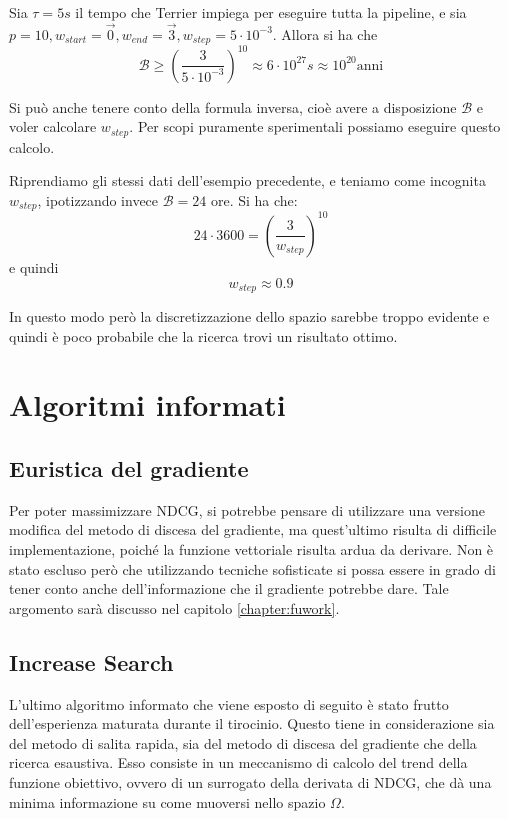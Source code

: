 \begin{esempio}\label{ex:gsspace}
	Sia $\tau = 5s$ il tempo che Terrier impiega per eseguire tutta la pipeline, e sia $p=10, w_{start} = \vec{0}, w_{end} = \vec{3}, w_{step} = 5 \cdot 10^{-3}$.
	Allora si ha che
	$$
	\mathcal{B} \geq \left(\frac{3}{5 \cdot 10^{-3}}\right)^{10} \approx 6 \cdot 10^{27}s \approx 10^{20} \text{anni}
	$$
\end{esempio}


\begin{esempio}
	Si può anche tenere conto della formula inversa, cioè avere a disposizione $\mathcal{B}$ e voler
	calcolare $w_{step}$. Per scopi puramente sperimentali possiamo eseguire questo calcolo.
	
	Riprendiamo gli stessi dati dell'esempio precedente, e teniamo come incognita $w_{step}$, ipotizzando
	invece $\mathcal{B} = 24$ ore.
	Si ha che:
	$$
	24 \cdot 3600 = \left(\frac{3}{w_{step}}\right)^{10}
	$$
	e quindi
	$$
	w_{step} \approx 0.9
	$$
	
	In questo modo però la discretizzazione dello spazio sarebbe troppo evidente e quindi è poco
	probabile che la ricerca trovi un risultato ottimo.
\end{esempio}

\section{Algoritmi informati}

\subsection{Euristica del gradiente}
Per poter massimizzare NDCG, si potrebbe pensare di utilizzare una versione
modifica del metodo di discesa del gradiente,
ma quest'ultimo risulta di difficile implementazione, poiché la funzione vettoriale
risulta ardua da derivare. Non è stato escluso però che utilizzando tecniche
sofisticate si possa essere in grado di tener conto anche dell'informazione
che il gradiente potrebbe dare.
Tale argomento sarà discusso nel capitolo \ref{chapter:fuwork}.

\subsection{Increase Search}
L'ultimo algoritmo informato che viene esposto di seguito è stato
frutto dell'esperienza maturata durante il tirocinio. Questo
tiene in considerazione sia del metodo di salita rapida,
sia del metodo di discesa del gradiente che della ricerca esaustiva. 
Esso consiste in un meccanismo di calcolo del trend della funzione obiettivo,
ovvero di un surrogato della derivata di NDCG, che dà una minima informazione su come
muoversi nello spazio $\Omega$.

